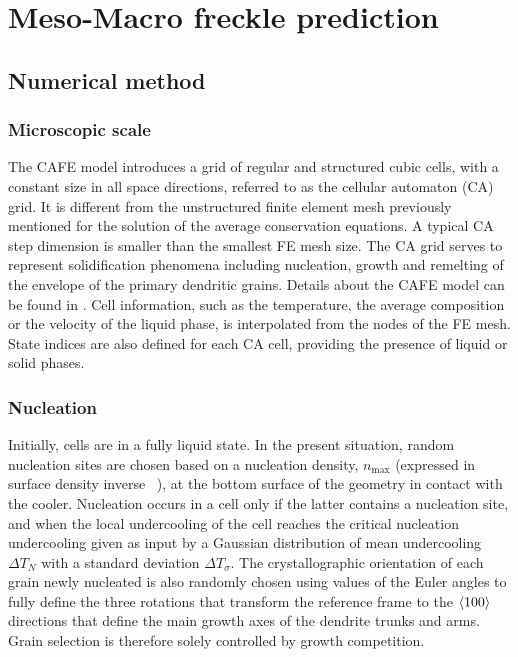 \section{Meso-Macro freckle prediction}
%
\subsection{Numerical method}
%
\subsubsection{Microscopic scale}
The CAFE model introduces a grid of regular and structured cubic cells, with a constant size 
in all space directions, referred to as the cellular automaton (CA) grid. It is different from 
the unstructured finite element mesh previously mentioned for the solution of the average conservation 
equations. A typical CA step dimension is smaller than the smallest FE mesh size. The CA grid serves to 
represent solidification phenomena including nucleation, growth and remelting of the envelope of the 
primary dendritic grains. Details about the CAFE model can be found in \citep{carozzani_3d_2012,carozzani_direct_2013,carozzani_optimized_2014}. 
Cell information, such as the temperature, the average composition or the velocity of the liquid phase, is interpolated from 
the nodes of the FE mesh. State indices are also defined for each CA cell, providing the presence of liquid or solid phases. 
%
\subsubsection{Nucleation}
Initially, cells are in a fully liquid state. In the present situation, random nucleation sites are 
chosen based on a nucleation density, $n_\text{max}$ (expressed in surface density inverse \si{\per \uarea}), at the 
bottom surface of the geometry in contact with the cooler. Nucleation occurs in a cell only if the 
latter contains a nucleation site, and when the local undercooling of the cell reaches the critical 
nucleation undercooling given as input by a Gaussian distribution of mean undercooling $\Delta T_N$ with a 
standard deviation $\Delta T_\sigma$. The crystallographic orientation of each grain newly nucleated is also randomly 
chosen using values of the Euler angles to fully define the three rotations that transform the reference 
frame to the $\langle 100 \rangle$ directions that define the main growth axes of the dendrite trunks and arms. Grain 
selection is therefore solely controlled by growth competition.
%
